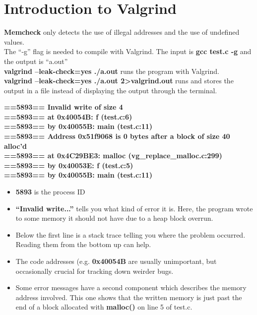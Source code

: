 \documentclass{article}
\begin{document}
\section{Introduction to Valgrind}
\textbf{Memcheck} only detects the use of illegal addresses and the use of undefined values.
\\ The ``-g'' flag is needed to compile with Valgrind. The input is \textbf{gcc test.c -g} and the output is ``a.out''
\\ \textbf{valgrind --leak-check=yes ./a.out} runs the program with Valgrind.
\\ \textbf{valgrind --leak-check=yes ./a.out 2\textgreater valgrind.out} runs and stores the output in a file instead of displaying the output through the terminal.
\begin{flushleft}
    \textbf{==5893== Invalid write of size 4 \\ ==5893== \hspace{15pt} at 0x40054B: f (test.c:6) \\ ==5893== \hspace{15pt} by 0x40055B: main (test.c:11) \\ ==5893== \hspace{3pt} Address 0x51f9068 is 0 bytes after a block of size 40 alloc'd \\ ==5893== \hspace{15pt} at 0x4C29BE3: malloc (vg\_replace\_malloc.c:299) \\ ==5893== \hspace{15pt} by 0x40053E: f (test.c:5) \\ ==5893== \hspace{15pt} by 0x40055B: main (test.c:11)}
\end{flushleft}
\begin{itemize}
\item \textbf{5893} is the process ID
\item \textbf{``Invalid write...''} tells you what kind of error it is. Here, the program wrote to some memory it should not have due to a heap block overrun.
\item Below the first line is a stack trace telling you where the problem occurred. Reading them from the bottom up can help.
\item The code addresses (e.g. \textbf{0x40054B} are usually unimportant, but occasionally crucial for tracking down weirder bugs.
\item Some error messages have a second component which describes the memory address involved. This one shows that the written memory is just past the end of a block allocated with \textbf{malloc()} on line 5 of test.c.
\end{itemize}
\end{document}
